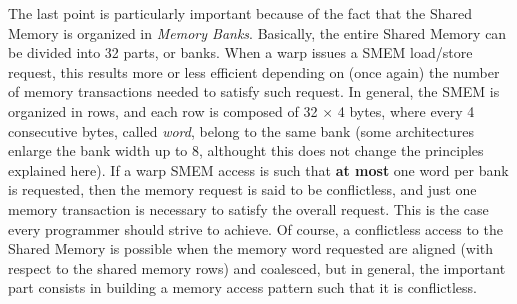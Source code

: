\documentclass[12pt]{extarticle}
\begin{document}
The last point is particularly important because of the fact that the Shared Memory is organized in \emph{Memory Banks}. Basically, the entire Shared Memory can be divided into 32 parts, or banks. When a warp issues a SMEM load/store request, this results more or less efficient depending on (once again) the number of memory transactions needed to satisfy such request. In general, the SMEM is organized in rows, and each row is composed of 32 $\times$ 4 bytes, where every 4 consecutive bytes, called \emph{word}, belong to the same bank (some architectures enlarge the bank width up to 8, althought this does not change the principles explained here). If a warp SMEM access is such that \textbf{at most} one word per bank is requested, then the memory request is said to be conflictless, and just one memory transaction is necessary to satisfy the overall request. This is the case every programmer should strive to achieve. Of course, a conflictless access to the Shared Memory is possible when the memory word requested are aligned (with respect to the shared memory rows) and coalesced, but in general, the important part consists in building a memory access pattern such that it is conflictless.\newline
\end{document}
